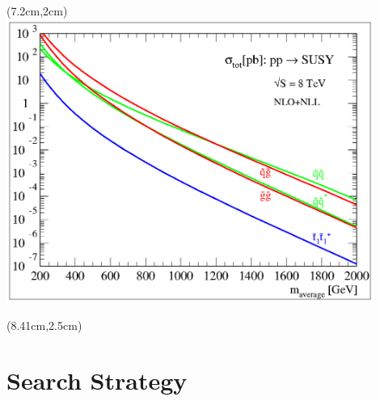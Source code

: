 \documentclass[compress, serif]{beamer}
\begin{document}
{\begin{textblock*}{6cm}(7.2cm,2cm) %
\includegraphics[width=0.9\textwidth, trim = .6cm .1cm .54cm .1cm, clip=true]{../figures/nlonll_lhc8_tpformat.eps}
\end{textblock*}
\begin{textblock*}{10cm}(8.41cm,2.5cm) %
\end{textblock*}
}

\section{Search Strategy}
\end{document}
